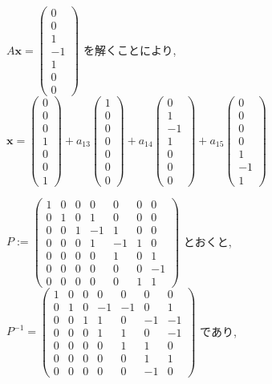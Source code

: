 \documentclass{jsarticle}
\begin{document}
$A\bm{x} = \begin{pmatrix} 0 \\ 0 \\ 1 \\ -1 \\ 1 \\ 0 \\ 0 \end{pmatrix}$ を解くことにより,
$\bm{x} = \begin{pmatrix} 0 \\ 0 \\ 0 \\ 1 \\ 0 \\ 0 \\ 1 \end{pmatrix} + a_{13} \begin{pmatrix} 1 \\ 0 \\ 0 \\ 0 \\ 0 \\ 0 \\ 0 \end{pmatrix} + a_{14} \begin{pmatrix}  0 \\ 1 \\ -1 \\ 1 \\ 0 \\ 0 \\ 0 \end{pmatrix} + a_{15} \begin{pmatrix} 0 \\ 0 \\ 0 \\ 0 \\ 1 \\ -1 \\ 1 \end{pmatrix}$

$P:= \begin{pmatrix} 1 & 0 & 0 & 0 & 0 & 0 & 0 \\ 0 & 1 & 0 & 1 & 0 & 0 & 0 \\ 0 & 0 & 1 & -1 & 1 & 0 & 0 \\ 0 & 0 & 0 & 1 & -1 & 1 & 0 \\ 0 & 0 & 0 & 0 & 1 & 0 & 1 \\ 0 & 0 & 0 & 0 & 0 & 0 & -1 \\ 0 & 0 & 0 & 0 & 0 & 1 & 1 \end{pmatrix}$ とおくと, 
$P^{-1} = \begin{pmatrix} 1 & 0 & 0 & 0 & 0 & 0 & 0 \\ 0 & 1 & 0 & -1 & -1 & 0 & 1 \\ 0 & 0 & 1 & 1 & 0 & -1 & -1 \\ 0 & 0 & 0 & 1 & 1 & 0 & -1 \\ 0 & 0 & 0 & 0 & 1 & 1 & 0 \\ 0 & 0 & 0 & 0 & 0 & 1 & 1 \\ 0 & 0 & 0 & 0 & 0 & -1 & 0 \end{pmatrix}$ であり, 
\end{document}
